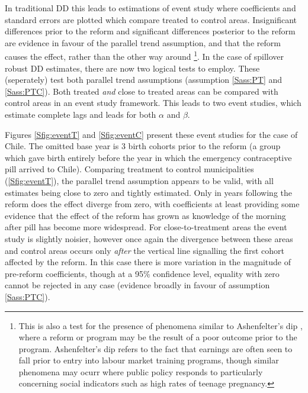 In traditional DD this leads to estimations of event study where coefficients
and standard errors are plotted which compare treated to control areas.  
Insignificant differences prior to the reform and significant differences 
posterior to the reform are evidence in favour of the parallel trend assumption,
and that the reform causes the effect, rather than the other way around%
\footnote{This is also a test for the presence of phenomena similar to 
Ashenfelter's dip \citep{Ashenfelter1978,HeckmanSmith1999}, where a reform or 
program may be the result of a poor outcome prior to the program.  Ashenfelter's 
dip refers to the fact that earnings are often seen to fall prior to entry into 
labour market training programs, though similar phenomena may ocurr where public 
policy responds to particularly concerning social indicators such as high rates 
of teenage pregnancy.}. In the case of spillover robust DD estimates, there are 
now two logical tests to employ.  These (seperately) test both parallel trend 
assumptions (assumption \ref{Sass:PT} and \ref{Sass:PTC}). Both treated 
\emph{and} close to treated areas can be compared with control areas in an event 
study framework.  This leads to two event studies, which estimate complete lags
and leads for both $\alpha$ and $\beta$.

Figures \ref{Sfig:eventT} and \ref{Sfig:eventC} present these event studies for
the case of Chile.  The omitted base year is 3 birth cohorts prior to the reform
(a group which gave birth entirely before the year in which the emergency 
contraceptive pill arrived to Chile).  Comparing treatment to control 
municipalities (\ref{Sfig:eventT}), the parallel trend assumption appears to
be valid, with all estimates being close to zero and tightly estimated.  Only
in years following the reform does the effect diverge from zero, with 
coefficients at least providing some evidence that the effect of the reform has
grown as knowledge of the morning after pill has become more widespread.  For 
close-to-treatment areas the event study is slightly noisier, however once again 
the divergence between these areas and control areas occurs only \emph{after}
the vertical line signalling the first cohort affected by the reform. In this
case there is more variation in the magnitude of pre-reform coefficients, though
at a 95\% confidence level, equality with zero cannot be rejected in any case 
(evidence broadly in favour of assumption \ref{Sass:PTC}).

